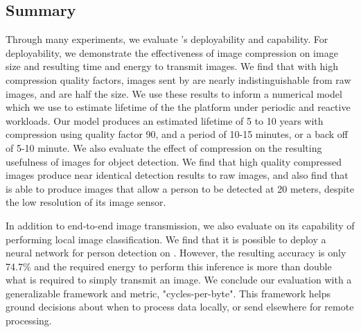 
\subsection{Summary}
Through many experiments, we evaluate \name's deployability and capability. For deployability, we demonstrate the effectiveness of image compression on image size and resulting time and energy to transmit images. We find that with high compression quality factors, images sent by \name are nearly indistinguishable from raw images, and are half the size. We use these results to inform a numerical model which we use to estimate lifetime of the the \name platform under periodic and reactive workloads. Our model produces an estimated lifetime of 5 to 10 years with compression using quality factor 90, and a period of 10-15 minutes, or a back off of 5-10 minute. We also evaluate the effect of compression on the resulting usefulness of images for object detection. We find that high quality compressed images produce near identical detection results to raw images, and also find that \name is able to produce images that allow a person to be detected at 20 meters, despite the low resolution of its image sensor.

In addition to end-to-end image transmission, we also evaluate \name on its capability of performing local image classification. We find that it is possible to deploy a neural network for person detection on \name. However, the resulting accuracy is only 74.7\% and the required energy to perform this inference is more than double what is required to simply transmit an image. We conclude our evaluation with a generalizable framework and metric, "cycles-per-byte". This framework helps ground decisions about when to process data locally, or send elsewhere for remote processing.
